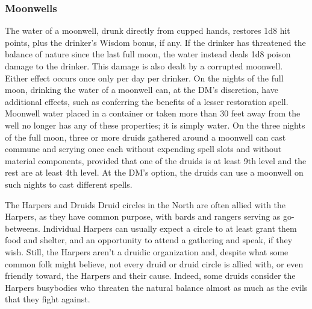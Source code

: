 \documentclass[10pt,a4paper,twoside,twocolumn,openany,bg=print,nodeprecatedcode]{dndbook}
\begin{document}
\subsubsection{Moonwells}
The water of a moonwell, drunk directly from cupped hands, restores 1d8 hit points, plus the drinker's Wisdom bonus, if any. If the drinker has threatened the balance of nature since the last full moon, the water instead deals 1d8 poison damage to the drinker. This damage is also dealt by a corrupted moonwell. Either effect occurs once only per day per drinker. On the nights of the full moon, drinking the water of a moonwell can, at the DM's discretion, have additional effects, such as conferring the benefits of a lesser restoration spell.
Moonwell water placed in a container or taken more than 30 feet away from the well no longer has any of these properties; it is simply water.
On the three nights of the full moon, three or more druids gathered around a moonwell can cast commune and scrying once each without expending spell slots and without material components, provided that one of the druids is at least 9th level and the rest are at least 4th level. At the DM's option, the druids can use a moonwell on such nights to cast different spells.
\begin{DndComment}{The Harpers and Druids}
Druid circles in the North are often allied with the Harpers, as they have common purpose, with bards and rangers serving as go-betweens. Individual Harpers can usually expect a circle to at least grant them food and shelter, and an opportunity to attend a gathering and speak, if they wish.
Still, the Harpers aren't a druidic organization and, despite what some common folk might believe, not every druid or druid circle is allied with, or even friendly toward, the Harpers and their cause. Indeed, some druids consider the Harpers busybodies who threaten the natural balance almost as much as the evils that they fight against.
\end{DndComment}
\end{document}
